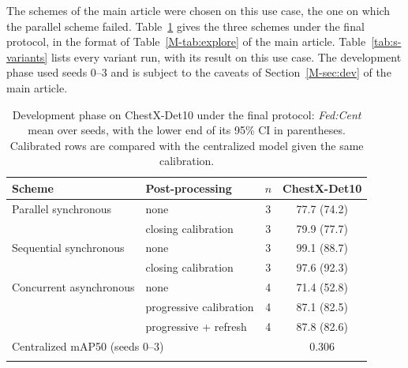 \documentclass[pdflatex,sn-mathphys-num]{sn-jnl}
\newcommand{\fedcent}{\textit{Fed:Cent}}
\begin{document}
The schemes of the main article were chosen on this use case, the one on which the parallel scheme failed. Table~\ref{tab:s-explore} gives the three schemes under the final protocol, in the format of Table~\ref{M-tab:explore} of the main article. Table~\ref{tab:s-variants} lists every variant run, with its result on this use case. The development phase used seeds 0--3 and is subject to the caveats of Section~\ref{M-sec:dev} of the main article.

\begin{table}[h]
\caption{Development phase on ChestX-Det10 under the final protocol: \fedcent{} mean over seeds, with the lower end of its 95\% CI in parentheses. Calibrated rows are compared with the centralized model given the same calibration.}\label{tab:s-explore}
\footnotesize
\begin{tabular*}{\textwidth}{@{\extracolsep\fill}llcc}
\toprule
Scheme & Post-processing & $n$ & ChestX-Det10 \\
\midrule
Parallel synchronous & none & 3 & 77.7 (74.2) \\
 & closing calibration & 3 & 79.9 (77.7) \\
Sequential synchronous & none & 3 & 99.1 (88.7) \\
 & closing calibration & 3 & 97.6 (92.3) \\
Concurrent asynchronous & none & 4 & 71.4 (52.8) \\
 & progressive calibration & 4 & 87.1 (82.5) \\
 & progressive + refresh & 4 & 87.8 (82.6) \\
\midrule
\multicolumn{3}{l}{Centralized mAP50 (seeds 0--3)} & 0.306 \\
\botrule
\end{tabular*}
\end{table}
\end{document}
